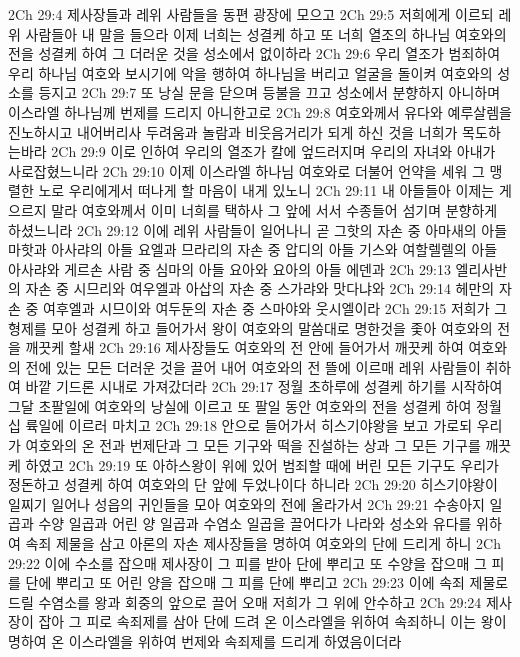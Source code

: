 2Ch 29:4  제사장들과 레위 사람들을 동편 광장에 모으고
2Ch 29:5  저희에게 이르되 레위 사람들아 내 말을 들으라 이제 너희는 성결케 하고 또 너희 열조의 하나님 여호와의 전을 성결케 하여 그 더러운 것을 성소에서 없이하라
2Ch 29:6  우리 열조가 범죄하여 우리 하나님 여호와 보시기에 악을 행하여 하나님을 버리고 얼굴을 돌이켜 여호와의 성소를 등지고
2Ch 29:7  또 낭실 문을 닫으며 등불을 끄고 성소에서 분향하지 아니하며 이스라엘 하나님께 번제를 드리지 아니한고로
2Ch 29:8  여호와께서 유다와 예루살렘을 진노하시고 내어버리사 두려움과 놀람과 비웃음거리가 되게 하신 것을 너희가 목도하는바라
2Ch 29:9  이로 인하여 우리의 열조가 칼에 엎드러지며 우리의 자녀와 아내가 사로잡혔느니라
2Ch 29:10  이제 이스라엘 하나님 여호와로 더불어 언약을 세워 그 맹렬한 노로 우리에게서 떠나게 할 마음이 내게 있노니
2Ch 29:11  내 아들들아 이제는 게으르지 말라 여호와께서 이미 너희를 택하사 그 앞에 서서 수종들어 섬기며 분향하게 하셨느니라
2Ch 29:12  이에 레위 사람들이 일어나니 곧 그핫의 자손 중 아마새의 아들 마핫과 아사랴의 아들 요엘과 므라리의 자손 중 압디의 아들 기스와 여할렐렐의 아들 아사랴와 게르손 사람 중 심마의 아들 요아와 요아의 아들 에덴과
2Ch 29:13  엘리사반의 자손 중 시므리와 여우엘과 아삽의 자손 중 스가랴와 맛다냐와
2Ch 29:14  헤만의 자손 중 여후엘과 시므이와 여두둔의 자손 중 스마야와 웃시엘이라
2Ch 29:15  저희가 그 형제를 모아 성결케 하고 들어가서 왕이 여호와의 말씀대로 명한것을 좇아 여호와의 전을 깨끗케 할새
2Ch 29:16  제사장들도 여호와의 전 안에 들어가서 깨끗케 하여 여호와의 전에 있는 모든 더러운 것을 끌어 내어 여호와의 전 뜰에 이르매 레위 사람들이 취하여 바깥 기드론 시내로 가져갔더라
2Ch 29:17  정월 초하루에 성결케 하기를 시작하여 그달 초팔일에 여호와의 낭실에 이르고 또 팔일 동안 여호와의 전을 성결케 하여 정월 십 륙일에 이르러 마치고
2Ch 29:18  안으로 들어가서 히스기야왕을 보고 가로되 우리가 여호와의 온 전과 번제단과 그 모든 기구와 떡을 진설하는 상과 그 모든 기구를 깨끗케 하였고
2Ch 29:19  또 아하스왕이 위에 있어 범죄할 때에 버린 모든 기구도 우리가 정돈하고 성결케 하여 여호와의 단 앞에 두었나이다 하니라
2Ch 29:20  히스기야왕이 일찌기 일어나 성읍의 귀인들을 모아 여호와의 전에 올라가서
2Ch 29:21  수송아지 일곱과 수양 일곱과 어린 양 일곱과 수염소 일곱을 끌어다가 나라와 성소와 유다를 위하여 속죄 제물을 삼고 아론의 자손 제사장들을 명하여 여호와의 단에 드리게 하니
2Ch 29:22  이에 수소를 잡으매 제사장이 그 피를 받아 단에 뿌리고 또 수양을 잡으매 그 피를 단에 뿌리고 또 어린 양을 잡으매 그 피를 단에 뿌리고
2Ch 29:23  이에 속죄 제물로 드릴 수염소를 왕과 회중의 앞으로 끌어 오매 저희가 그 위에 안수하고
2Ch 29:24  제사장이 잡아 그 피로 속죄제를 삼아 단에 드려 온 이스라엘을 위하여 속죄하니 이는 왕이 명하여 온 이스라엘을 위하여 번제와 속죄제를 드리게 하였음이더라
